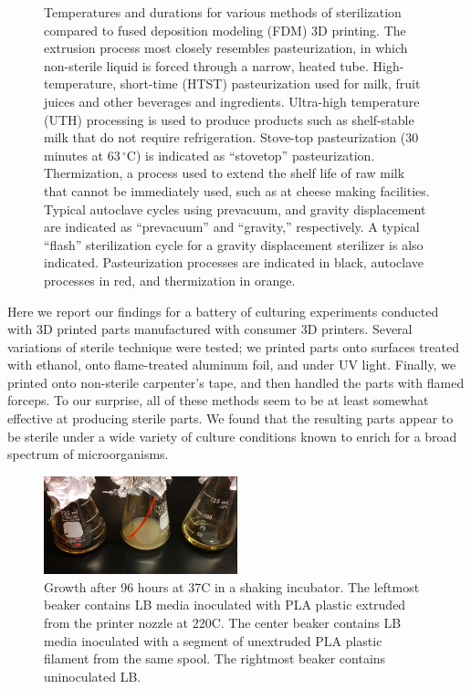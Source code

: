 \documentclass[fleqn,10pt]{wlpeerj}
\begin{document}
\begin{figure}
\begin{minipage}[c]{0.40\linewidth}
    \par\vspace{0pt}
  \end{minipage}
\caption{Temperatures and durations for various methods of sterilization
compared to fused deposition modeling (FDM) 3D printing. The extrusion
process most closely resembles pasteurization, in which non-sterile
liquid is forced through a narrow, heated tube. High-temperature,
short-time (HTST) pasteurization used for milk, fruit juices and other
beverages and ingredients. Ultra-high temperature (UTH) processing is
used to produce products such as shelf-stable milk that do not require
refrigeration. Stove-top pasteurization (30 minutes at
63$\,^{\circ}\mathrm{C}$) is indicated as ``stovetop'' pasteurization.
Thermization, a process used to extend the shelf life of raw milk that
cannot be immediately used, such as at cheese making facilities.
Typical autoclave cycles using prevacuum, and gravity displacement are
indicated as ``prevacuum'' and ``gravity,'' respectively. A typical
``flash'' sterilization cycle for a gravity displacement sterilizer is
also indicated. Pasteurization processes are indicated in black,
autoclave processes in red, and thermization in orange.}
\label{fig:pasteurization}
\end{figure}

Here we report our findings for a battery of culturing experiments conducted with 3D printed parts manufactured with consumer 3D printers. Several variations of sterile technique were tested; we printed parts onto surfaces treated with ethanol, onto flame-treated aluminum foil, and under UV light. Finally, we printed onto non-sterile carpenter's tape, and then handled the parts with flamed forceps. To our surprise, all of these methods seem to be at least somewhat effective at producing sterile parts. We found that the resulting parts appear to be sterile under a wide variety of culture conditions known to enrich for a broad spectrum of microorganisms.

\begin{figure}
  \centering
    \includegraphics[width=0.5\textwidth]{preliminary_test}
    \caption{Growth after 96 hours at 37C in a shaking incubator. The leftmost beaker contains LB media inoculated with PLA plastic extruded from the printer nozzle at 220C. The center beaker contains LB media inoculated with a segment of unextruded PLA plastic filament from the same spool. The rightmost beaker contains uninoculated LB.}
    \label{fig:preliminary}
\end{figure}
\end{document}
